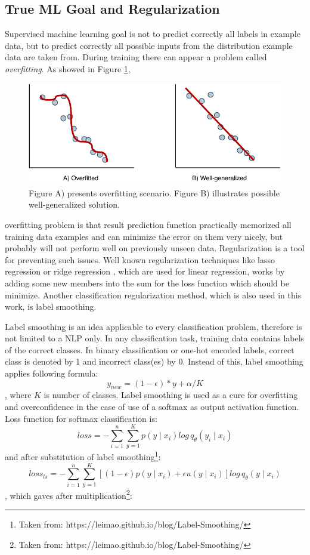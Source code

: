 \subsection{True ML Goal and Regularization}
Supervised machine learning goal is not to predict correctly all labels in example data, but to predict correctly all possible inputs from the distribution example data are taken from. During training there can appear a problem called \textit{overfitting}. As showed in Figure \ref{pic:overfitting}, 

\begin{figure}[h]
\centering
\includegraphics[width=0.7\columnwidth]{../img/overfitting}
\caption{Figure A) presents overfitting scenario. Figure B) illustrates possible well-generalized solution. }
\label{pic:overfitting}
\end{figure}
overfitting problem is that result prediction function practically memorized all training data examples and can minimize the error on them very nicely, but probably will not perform well on previously unseen data. Regularization is a tool for preventing such issues. Well known regularization techniques like lasso regression \citep{Tibshirani1996} or ridge regression \citep{Hoerl1970}, which are used for linear regression, works by adding some new members into the sum for the loss function which should be minimize. %
Another classification regularization method, which is also used in this work, is label smoothing.
\par
Label smoothing \citep{Szegedy2015} is an idea applicable to every classification problem, therefore is not limited to a NLP only.
In any classification task, training data contains labels of the correct classes. In binary classification or one-hot encoded labels, correct class is denoted by 1 and incorrect class(es) by 0. Instead of this, label smoothing applies following formula: 
$$y_{new} = (1 - \epsilon) * y + \alpha / K$$, where $K$ is number of classes. Label smoothing is used as a cure for overfitting and overconfidence in the case of use of a softmax 
 as output activation function. Loss function for softmax classification is: 
 $$ loss = -\sum_{i=1}^{n} \sum_{y=1}^{K} p(y \mid x_i) log \, q_{\theta} ( y_i \mid x_i ) $$
 and after substitution of label smoothing\footnote{Taken from: https://leimao.github.io/blog/Label-Smoothing/}:
$$
loss_{ls} = -\sum_{i=1}^{n} \sum_{y=1}^{K} [(1-\epsilon) p(y \mid x_i)+\epsilon u(y\mid x_i)]log \, q_\theta(y \mid x_i) $$,
which gaves after multiplication\footnote{Taken from: https://leimao.github.io/blog/Label-Smoothing/}:

